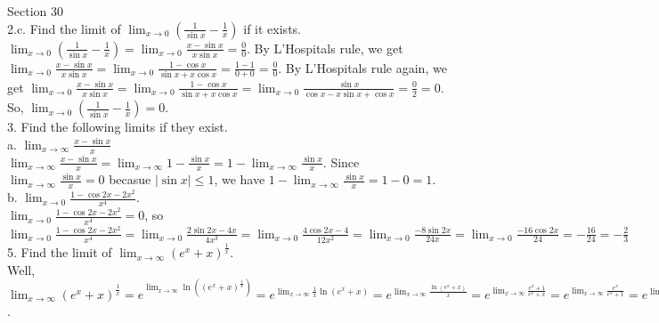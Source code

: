 \documentclass[12pt]{article}
\begin{document}
Section 30\\

2.c. Find the limit of $\lim_{x\rightarrow0}(\frac{1}{\sin x}-\frac{1}{x})$ if it exists.\\
$\lim_{x\rightarrow0}(\frac{1}{\sin x}-\frac{1}{x})=\lim_{x\rightarrow0}\frac{x-\sin x}{x\sin x}=\frac00$. By L'Hospitals rule, we get $\lim_{x\rightarrow0}\frac{x-\sin x}{x\sin x}=\lim_{x\rightarrow0}\frac{1-\cos x}{\sin x+x\cos x}=\frac{1-1}{0+0}=\frac00$. By L'Hospitals rule again, we get $\lim_{x\rightarrow0}\frac{x-\sin x}{x\sin x}=\lim_{x\rightarrow0}\frac{1-\cos x}{\sin x+x\cos x}=\lim_{x\rightarrow0}\frac{\sin x}{\cos x-x\sin x+\cos x}=\frac02=0$. So, $\lim_{x\rightarrow0}(\frac{1}{\sin x}-\frac{1}{x})=0$.\\[20pt]

3. Find the following limits if they exist.\\
a. $\lim_{x\rightarrow\infty}\frac{x-\sin x}{x}$\\
$\lim_{x\rightarrow\infty}\frac{x-\sin x}{x}=\lim_{x\rightarrow\infty}1-\frac{\sin x}{x}=1-\lim_{x\rightarrow\infty}\frac{\sin x}{x}$. Since $\lim_{x\rightarrow\infty}\frac{\sin x}{x}=0$ becasue $|\sin x|\leq1$, we have $1-\lim_{x\rightarrow\infty}\frac{\sin x}{x}=1-0=1$.\\
b. $\lim_{x\rightarrow0}\frac{1-\cos2x-2x^2}{x^4}$.\\
$\lim_{x\rightarrow0}\frac{1-\cos2x-2x^2}{x^4}=0$, so $\lim_{x\rightarrow0}\frac{1-\cos2x-2x^2}{x^4}=\lim_{x\rightarrow0}\frac{2\sin2x-4x}{4x^3}=\lim_{x\rightarrow0}\frac{4\cos2x-4}{12x^2}=\lim_{x\rightarrow0}\frac{-8\sin2x}{24x}=\lim_{x\rightarrow0}\frac{-16\cos2x}{24}=-\frac{16}{24}=-\frac23$\\[20pt]

5. Find the limit of $\lim_{x\rightarrow\infty}(e^x+x)^{\frac1x}$.\\
Well, $\lim_{x\rightarrow\infty}(e^x+x)^{\frac1x}=e^{\lim_{x\rightarrow\infty}\ln((e^x+x)^{\frac1x})}=e^{\lim_{x\rightarrow\infty}\frac1x\ln(e^x+x)}=e^{\lim_{x\rightarrow\infty}\frac{\ln(e^x+x)}{x}}=e^{\lim_{x\rightarrow\infty}\frac{e^x+1}{e^x+x}}=e^{\lim_{x\rightarrow\infty}\frac{e^x}{e^x+1}}=e^{\lim_{x\rightarrow\infty}\frac{e^x}{e^x}}=e^1=e$.
\end{document}
